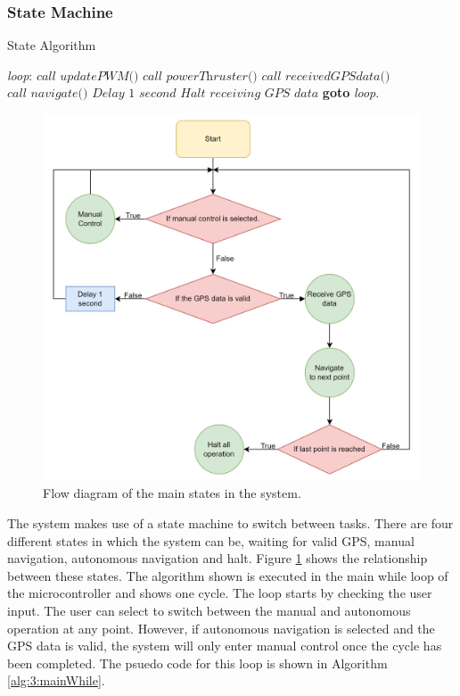 		\subsubsection{State Machine}
		\begin{algorithm}[!hb]
			\caption{State Algorithm}
			\label{alg:3:mainWhile}
			\begin{algorithmic}[1]
				\BState \emph{loop}:
				\State $\textit{call updatePWM()}$
				\State $\textit{call powerThruster()}$
				\Else 
				\State $\textit{call receivedGPSdata()}$
				\State $\textit{call navigate()}$
				\Else
				\State $\textit{Delay 1 second}$
				\EndIf
				\State $\textit{Halt receiving GPS data}$
				\EndIf
				\EndIf
				\State \textbf{goto} \emph{loop}.
			\end{algorithmic}
		\end{algorithm}
	\begin{figure}[!ht]
		\begin{center}
			\includegraphics[width = 0.66\linewidth]{figures/statemachine.png}
			\caption{Flow diagram of the main states in the system.}
			\label{fig:3:stateMachine}
		\end{center}
	\end{figure}
		The system makes use of a state machine to switch between tasks. There are four different states in which the system can be, waiting for valid GPS, manual navigation, autonomous navigation and halt. Figure \ref{fig:3:stateMachine} shows the relationship between these states. The algorithm shown is executed in the main while loop of the microcontroller and shows one cycle. The loop starts by checking the user input. The user can select to switch between the manual and autonomous operation at any point. However, if autonomous navigation is selected and the GPS data is valid, the system will only enter manual control once the cycle has been completed. The psuedo code for this loop is shown in Algorithm \ref{alg:3:mainWhile}.
		
